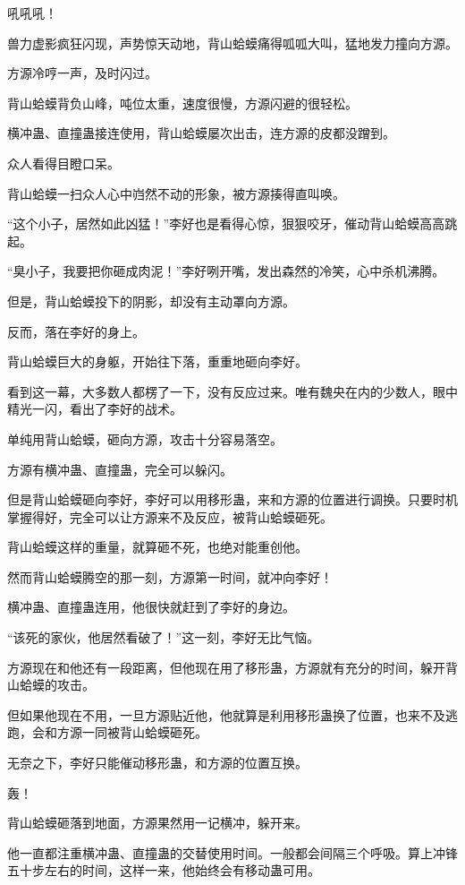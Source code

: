 
\begin{this_body}

吼吼吼！

兽力虚影疯狂闪现，声势惊天动地，背山蛤蟆痛得呱呱大叫，猛地发力撞向方源。

方源冷哼一声，及时闪过。

背山蛤蟆背负山峰，吨位太重，速度很慢，方源闪避的很轻松。

横冲蛊、直撞蛊接连使用，背山蛤蟆屡次出击，连方源的皮都没蹭到。

众人看得目瞪口呆。

背山蛤蟆一扫众人心中岿然不动的形象，被方源揍得直叫唤。

“这个小子，居然如此凶猛！”李好也是看得心惊，狠狠咬牙，催动背山蛤蟆高高跳起。

“臭小子，我要把你砸成肉泥！”李好咧开嘴，发出森然的冷笑，心中杀机沸腾。

但是，背山蛤蟆投下的阴影，却没有主动罩向方源。

反而，落在李好的身上。

背山蛤蟆巨大的身躯，开始往下落，重重地砸向李好。

看到这一幕，大多数人都楞了一下，没有反应过来。唯有魏央在内的少数人，眼中精光一闪，看出了李好的战术。

单纯用背山蛤蟆，砸向方源，攻击十分容易落空。

方源有横冲蛊、直撞蛊，完全可以躲闪。

但是背山蛤蟆砸向李好，李好可以用移形蛊，来和方源的位置进行调换。只要时机掌握得好，完全可以让方源来不及反应，被背山蛤蟆砸死。

背山蛤蟆这样的重量，就算砸不死，也绝对能重创他。

然而背山蛤蟆腾空的那一刻，方源第一时间，就冲向李好！

横冲蛊、直撞蛊连用，他很快就赶到了李好的身边。

“该死的家伙，他居然看破了！”这一刻，李好无比气恼。

方源现在和他还有一段距离，但他现在用了移形蛊，方源就有充分的时间，躲开背山蛤蟆的攻击。

但如果他现在不用，一旦方源贴近他，他就算是利用移形蛊换了位置，也来不及逃跑，会和方源一同被背山蛤蟆砸死。

无奈之下，李好只能催动移形蛊，和方源的位置互换。

轰！

背山蛤蟆砸落到地面，方源果然用一记横冲，躲开来。

他一直都注重横冲蛊、直撞蛊的交替使用时间。一般都会间隔三个呼吸。算上冲锋五十步左右的时间，这样一来，他始终会有移动蛊可用。


\end{this_body}
